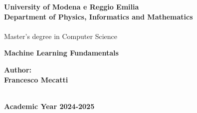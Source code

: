 \documentclass[12pt,a4paper,twoside,onecolumn,openright]{book}
\begin{document}
\begin{sloppypar}

\begin{titlepage}
\begin{center} {
    \large
    \textbf{University of Modena e Reggio Emilia} \\
     \textbf{Department of Physics, Informatics and Mathematics} \\
    \hspace*{0cm} \hrulefill \hspace*{0cm} \\
    Master's degree in Computer Science
    
    \begin{spacing}{1}
        \huge{\bf Machine Learning Fundamentals}
    \end{spacing}
}
\vspace{3mm}
\end{center}

\vspace{40mm}
\par
\noindent
\hfill
\begin{minipage}[t]{0.47\textwidth}\raggedleft
{\large{\bf Author:\\ Francesco Mecatti}}
\end{minipage}
\vspace{10mm}

\begin{center}
\hspace*{0cm} \hrulefill \hspace*{0cm} \\
\vspace{5mm}
{\large{\bf Academic Year 2024-2025}}
\end{center}
\end{titlepage}

\setlength{\parindent}{0pt}
\setlength{\parskip}{1ex plus 0.5ex minus 0.2ex}
\frontmatter
\mainmatter

\newcommand{\whitepage}{\hbox{}\thispagestyle{empty}\newpage}

\renewcommand{\contentsname}{Table of Contents} \tableofcontents


\end{sloppypar}
\end{document}

